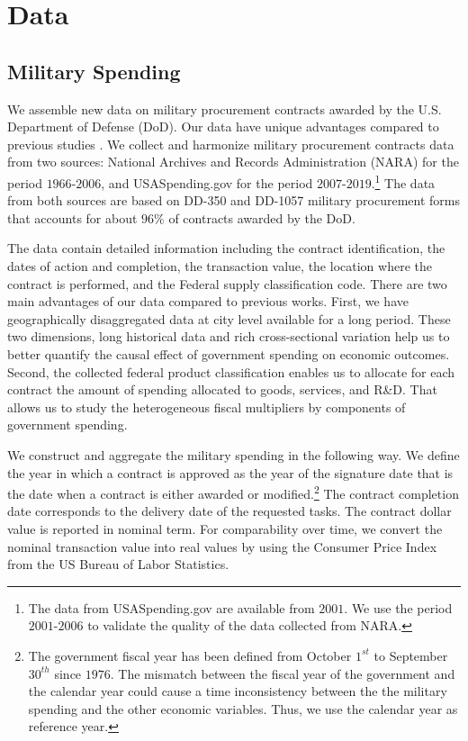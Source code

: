 \documentclass[dv_diss_main.tex]{subfiles}
\begin{document}

\section{Data}
\label{sec:data}

\subsection{Military Spending}
\label{subsec:data_mil}

We assemble new data on military procurement contracts awarded by the U.S. Department of Defense (DoD). Our data have unique advantages compared to previous studies \citep{Nakamura2014, Dupor2017, Auerbach2020}. We collect and harmonize military procurement contracts data from two sources: National Archives and Records Administration (NARA) for the period $1966$-$2006$, and USASpending.gov for the period $2007$-$2019$.\footnote{The data from USASpending.gov are available from $2001$. We use the period $2001$-$2006$ to validate the quality of the data collected from NARA.} The data from both sources are based on DD-350 and DD-1057 military procurement forms that accounts for about $96\%$ of contracts awarded by the DoD.

The data contain detailed information including the contract identification, the dates of action and completion, the transaction value, the location where the contract is performed, and the Federal supply classification code. There are two main advantages of our data compared to previous works. First, we have geographically disaggregated data at city level available for a long period. These two dimensions, long historical data and rich cross-sectional variation help us to better quantify the causal effect of government spending on economic outcomes. Second, the collected federal product classification enables us to allocate for each contract the amount of spending allocated to goods, services, and R\&D. That allows us to study the heterogeneous fiscal multipliers by components of government spending.

We construct and aggregate the military spending in the following way. We define the year in which a contract is approved as the year of the signature date that is the date when a contract is either awarded or modified.\footnote{The government fiscal year has been defined from October $1^{st}$ to September $30^{th}$ since $1976$. The mismatch between the fiscal year of the government and the calendar year could cause a time inconsistency between the the military spending and the other economic variables. Thus, we use the calendar year as reference year.} The contract completion date corresponds to the delivery date of the requested tasks. The contract dollar value is reported in nominal term. For comparability over time, we convert the nominal transaction value into real values by using the Consumer Price Index from the US Bureau of Labor Statistics.
\end{document}
